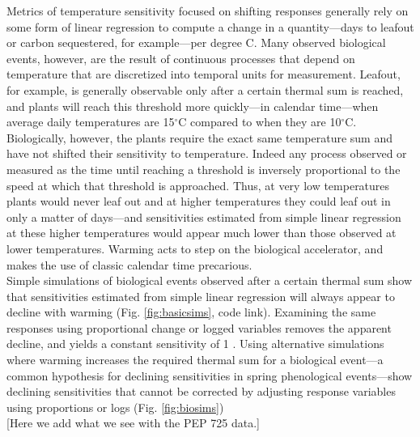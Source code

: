 \documentclass[11pt,letter]{article}
\begin{document}
Metrics of temperature sensitivity focused on shifting responses generally rely on some form of linear regression to compute a change in a quantity---days to leafout or carbon sequestered, for example---per degree C. Many observed biological events, however, are the result of continuous processes that depend on temperature that are discretized into temporal units for measurement. Leafout, for example, is generally observable only after a certain thermal sum is reached, and plants will reach this threshold more quickly---in calendar time---when average daily temperatures are 15$^{\circ}$C compared to when they are 10$^{\circ}$C. Biologically, however, the plants require the exact same temperature sum and have not shifted their sensitivity to temperature. Indeed any process observed or measured as the time until reaching a threshold is inversely proportional to the speed at which that threshold is approached. Thus, at very low temperatures plants would never leaf out and at higher temperatures they could leaf out in only a matter of days---and sensitivities estimated from simple linear regression at these higher temperatures would appear much lower than those observed at lower temperatures. Warming acts to step on the biological accelerator, and makes the use of classic calendar time precarious. \\

Simple simulations of biological events observed after a certain thermal sum show that sensitivities estimated from simple linear regression will always appear to decline with warming (Fig. \ref{fig:basicsims}, code link). Examining the same responses using proportional change or logged variables removes the apparent decline, and yields a constant sensitivity of 1 \citep[the expected slope given that these sensitivities are effectively include temperature as both the predictor and response variable, ][]{nee2005}. Using alternative simulations where warming increases the required thermal sum for a biological event---a common hypothesis for declining sensitivities in spring phenological events---show declining sensitivities that cannot be corrected by adjusting response variables using proportions or logs (Fig. \ref{fig:biosims}) \\

[Here we add what we see with the PEP 725 data.] \\
\end{document}
